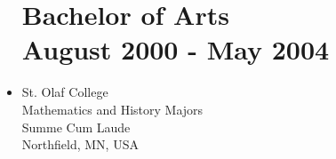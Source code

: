 \documentclass[margin]{res}
\begin{document}
\begin{resume}
\begin{itemize}
\normalsize{\section{\bf Bachelor of Arts \\ August 2000 - May 2004}}
\item[] St. Olaf College  \\
Mathematics and History Majors \\
Summe Cum Laude \\
Northfield, MN, USA \\
\end{itemize}


\end{resume} 
\end{document}
